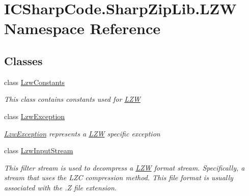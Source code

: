 \hypertarget{namespace_i_c_sharp_code_1_1_sharp_zip_lib_1_1_l_z_w}{}\section{I\+C\+Sharp\+Code.\+Sharp\+Zip\+Lib.\+L\+ZW Namespace Reference}
\label{namespace_i_c_sharp_code_1_1_sharp_zip_lib_1_1_l_z_w}
\subsection*{Classes}
\begin{DoxyCompactItemize}
\item 
class \hyperlink{class_i_c_sharp_code_1_1_sharp_zip_lib_1_1_l_z_w_1_1_lzw_constants}{Lzw\+Constants}
\begin{DoxyCompactList}\small\item\em This class contains constants used for \hyperlink{namespace_i_c_sharp_code_1_1_sharp_zip_lib_1_1_l_z_w}{L\+ZW} \end{DoxyCompactList}\item 
class \hyperlink{class_i_c_sharp_code_1_1_sharp_zip_lib_1_1_l_z_w_1_1_lzw_exception}{Lzw\+Exception}
\begin{DoxyCompactList}\small\item\em \hyperlink{class_i_c_sharp_code_1_1_sharp_zip_lib_1_1_l_z_w_1_1_lzw_exception}{Lzw\+Exception} represents a \hyperlink{namespace_i_c_sharp_code_1_1_sharp_zip_lib_1_1_l_z_w}{L\+ZW} specific exception \end{DoxyCompactList}\item 
class \hyperlink{class_i_c_sharp_code_1_1_sharp_zip_lib_1_1_l_z_w_1_1_lzw_input_stream}{Lzw\+Input\+Stream}
\begin{DoxyCompactList}\small\item\em This filter stream is used to decompress a \hyperlink{namespace_i_c_sharp_code_1_1_sharp_zip_lib_1_1_l_z_w}{L\+ZW} format stream. Specifically, a stream that uses the L\+ZC compression method. This file format is usually associated with the .Z file extension. \end{DoxyCompactList}\end{DoxyCompactItemize}
